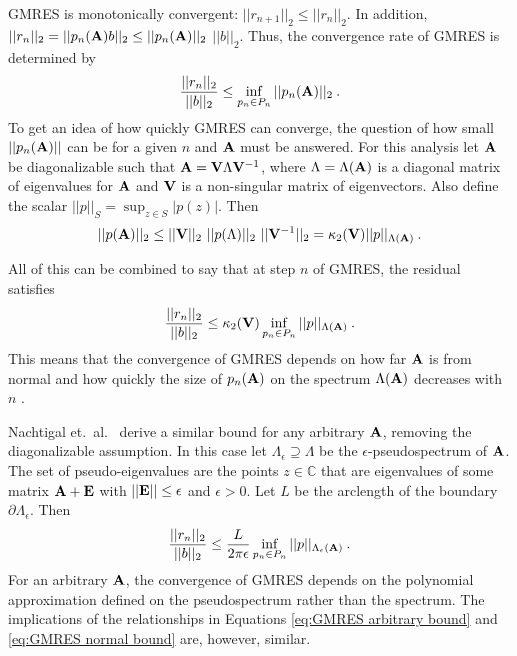 GMRES is monotonically convergent: $||r_{n+1}||_{2} \le ||r_{n}||_{2}$. In addition, $||r_{n}||_{2} = ||p_{n}(\mathbf{A})b||_{2} \le ||p_{n}(\mathbf{A})||_{2}$ $||b||_{2}$. Thus, the convergence rate of GMRES is determined by
%
\begin{equation}
  \frac{||r_{n}||_{2}}{||b||_{2}} \le \inf_{p_{n}\in P_{n}} ||p_{n}(\mathbf{A})||_{2} \:.
\end{equation}
%
To get an idea of how quickly GMRES can converge, the question of how small $||p_{n}(\mathbf{A})||$ can be for a given $n$ and $\mathbf{A}$ must be answered. For this analysis let $\mathbf{A}$ be diagonalizable such that $\mathbf{A}=\mathbf{V} \Lambda \mathbf{V}^{-1}$, where $\Lambda = \Lambda(\mathbf{A})$ is a diagonal matrix of eigenvalues for $\mathbf{A}$ and $\mathbf{V}$ is a non-singular matrix of eigenvectors. Also define the scalar $||p||_{S} = \sup_{z\in S} |p(z)|$. Then \cite{Trefethen1997}
%
\begin{equation}
  ||p(\mathbf{A})||_{2} \le ||\mathbf{V}||_{2} \text{ } ||p(\Lambda)||_{2} \text{ } ||\mathbf{V}^{-1}||_{2} = \kappa_{2}(\mathbf{V}) ||p||_{\Lambda(\mathbf{A})} \:.
\end{equation}

All of this can be combined to say that at step $n$ of GMRES, the residual satisfies
%
\begin{equation}
  \frac{||r_{n}||_{2}}{||b||_{2}} \le \kappa_{2}(\mathbf{V})  \inf_{p_{n}\in P_{n}} ||p||_{\Lambda(\mathbf{A})} \:.
  \label{eq:GMRES normal bound}
\end{equation}
%
This means that the convergence of GMRES depends on how far $\mathbf{A}$ is from normal and how quickly the size of $p_{n}(\mathbf{A})$ on the spectrum $\Lambda(\mathbf{A})$ decreases with $n$ \cite{Trefethen1997}. 

Nachtigal et.\ al.\ \cite{Nachtigal1992} derive a similar bound for any arbitrary $\mathbf{A}$, removing the diagonalizable assumption. In this case let $\Lambda_{\epsilon} \supseteq \Lambda$ be the $\epsilon$-pseudospectrum of $\mathbf{A}$. The set of pseudo-eigenvalues are the points $z \in \mathbb{C}$ that are eigenvalues of some matrix $\mathbf{A} + \mathbf{E}$ with $||\mathbf{E}|| \le \epsilon$ and $\epsilon > 0$. Let $L$ be the arclength of the boundary $\partial \Lambda_{\epsilon}$. Then
%
\begin{equation}
  \frac{||r_{n}||_{2}}{||b||_{2}} \le \frac{L}{2 \pi \epsilon} \inf_{p_{n}\in P_{n}} ||p||_{\Lambda_{\epsilon}(\mathbf{A})} \:.
  \label{eq:GMRES arbitrary bound}
\end{equation}
%
For an arbitrary $\mathbf{A}$, the convergence of GMRES depends on the polynomial approximation defined on the pseudospectrum rather than the spectrum. The implications of the relationships in Equations \eqref{eq:GMRES arbitrary bound} and \eqref{eq:GMRES normal bound} are, however, similar.

